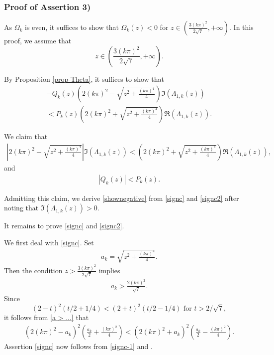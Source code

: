 \documentclass[11pt, reqno]{amsart}
\theoremstyle{plain}
\numberwithin{equation}{section}
\begin{document}
\subsubsection{Proof of Assertion 3)} \label{sect-as-behavior-p3}
As $\Omega_k$ is even, it suffices to show that $\Omega_k(z) < 0$ for
$z \in \left(\frac{3(k \pi)^2}{2 \sqrt{7}}, +\infty \right)$. In this proof, we assume that 
$$
 z \in \left(\frac{3(k \pi)^2}{2 \sqrt{7}}, +\infty \right). 
$$

By Proposition \ref{prop-Theta}, it suffices to show that 
    \begin{multline}   \label{shownegative}
        - Q_k(z)  \left(2(k \pi)^2 - \sqrt{z^2 + \frac{(k \pi)^4}{4}} \right) \Im (\Lambda_{1,k}(z)) \\
        < P_k(z)  \left( 2(k \pi)^2 + \sqrt{z^2 + \frac{(k \pi)^4}{4} } \right)\Re (\Lambda_{1,k}(z)). 
    \end{multline}


We claim that
    \begin{align}   
         \label{signc}
     \left|2(k \pi)^2 - \sqrt{z^2 + \frac{(k \pi)^4}{4} } \right|   \Im (\Lambda_{1,k}(z))  <  \left( 2(k \pi)^2 + \sqrt{z^2 + \frac{(k \pi)^4}{4} }\right)\Re (\Lambda_{1,k}(z)),
    \end{align}
    and
    \begin{align}	\label{signc2}
    |Q_k(z)| < P_k(z).
    \end{align}

Admitting this claim, we derive \eqref{shownegative} from \eqref{signc} and \eqref{signc2} after noting that $\Im(\Lambda_{1,k}(z)) > 0$.

\medskip
    
    
It remains to prove \eqref{signc} and \eqref{signc2}. 

\medskip 
We first deal with \eqref{signc}. Set
\begin{align}	\label{defa}
a_k = \displaystyle \sqrt{z^2 + \frac{(k \pi)^4}{4}}. 
\end{align}
Then the condition $z > \frac{3(k \pi)^2}{2\sqrt{7}}$ implies 
\begin{align}	\label{a > ...}
	a_k  > \frac{2(k \pi)^2}{\sqrt{7}}.
\end{align}
Since 
$$
(2 -t)^2 (t/2 + 1/4) < (2 + t)^2 (t/2 - 1/4) \mbox{ for } t > 2/ \sqrt{7}, 
$$
it follows from \eqref{a > ...} that
\begin{align}\label{signc-1}
	 \left( 2(k \pi)^2 - a_k \right)^2 \left(\frac{a_k}{2} + \frac{(k \pi)^2}{4} \right) <  \left(  2(k \pi)^2 + a_k \right)^2 \left( \frac{a_k}{2} - \frac{(k \pi)^2}{4} \right).
\end{align}
Assertion \eqref{signc} now follows from \eqref{signc-1} and . 
\end{document}
